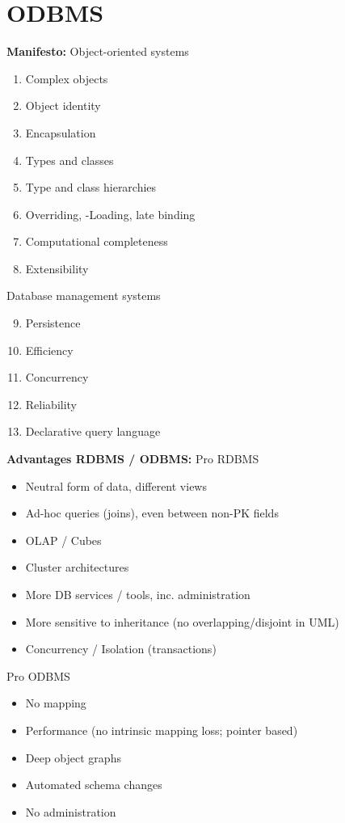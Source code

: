 
\section{ODBMS}

\begin{breakbox}
\textbf{Manifesto:}
\newline Object-oriented systems
\begin{enumerate}
	\item Complex objects
	\item Object identity
	\item Encapsulation
	\item Types and classes
	\item Type and class hierarchies
	\item Overriding, -Loading, late binding
	\item Computational completeness
	\item Extensibility
\end{enumerate}
Database management systems
\begin{enumerate}
	\setcounter{enumi}{8}
	\item Persistence
	\item Efficiency
	\item Concurrency
	\item Reliability
	\item Declarative query language
\end{enumerate}
\end{breakbox}

\begin{breakbox}
\textbf{Advantages RDBMS / ODBMS:}
\newline Pro RDBMS
\begin{itemize}
	\item Neutral form of data, different views
	\item Ad-hoc queries (joins), even between non-PK fields
	\item OLAP / Cubes
	\item Cluster architectures
	\item More DB services / tools, inc. administration
	\item More sensitive to inheritance (no overlapping/disjoint in UML)
	\item Concurrency / Isolation (transactions)
\end{itemize}
Pro ODBMS
\begin{itemize}
	\item No mapping
	\item Performance (no intrinsic mapping loss; pointer based)
	\item Deep object graphs
	\item Automated schema changes
	\item No administration
\end{itemize}
\end{breakbox}

